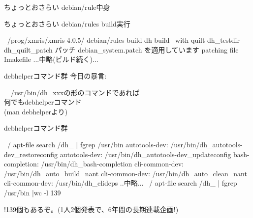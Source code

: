 \begin{frame}[containsverbatim]{ちょっとおさらい}
debian/rule中身
\end{frame}
\begin{frame}[containsverbatim]{ちょっとおさらい}
debian/rules build実行
\begin{commandline}
~/prog/xmris/xmris-4.0.5/ debian/rules build
dh build --with quilt
   dh_testdir
   dh_quilt_patch
パッチ debian_system.patch を適用しています
patching file Imakefile
...中略(ビルド続く)...
\end{commandline}
\end{frame}
\begin{frame}{debhelperコマンド群}
今日の暴言:
\begin{center}
　/usr/bin/dh\_xxxの形のコマンドであれば\\
何でもdebhelperコマンド\\
 (man debhelperより)
\end{center}
\end{frame}
\begin{frame}[containsverbatim]{debhelperコマンド群}
\begin{commandline}
~/ apt-file search /dh_ | fgrep /usr/bin 
autotools-dev: /usr/bin/dh_autotools-dev_restoreconfig
autotools-dev: /usr/bin/dh_autotools-dev_updateconfig
bash-completion: /usr/bin/dh_bash-completion
cli-common-dev: /usr/bin/dh_auto_build_nant
cli-common-dev: /usr/bin/dh_auto_clean_nant
cli-common-dev: /usr/bin/dh_clideps
..中略...
~/ apt-file search /dh_ | fgrep /usr/bin |wc -l
139
\end{commandline}
!139個もあるぞ。(1人2個発表で、6年間の長期連載企画!)
\end{frame}

